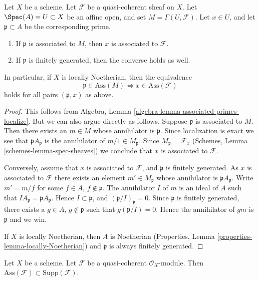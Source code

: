 \begin{lemma}
\label{lemma-associated-affine-open}
Let $X$ be a scheme. Let $\mathcal{F}$ be a quasi-coherent sheaf on $X$.
Let $\Spec(A) = U \subset X$ be an affine open, and set
$M = \Gamma(U, \mathcal{F})$.
Let $x \in U$, and let $\mathfrak p \subset A$ be the corresponding prime.
\begin{enumerate}
\item If $\mathfrak p$ is associated to $M$, then $x$ is associated
to $\mathcal{F}$.
\item If $\mathfrak p$ is finitely generated, then the converse holds
as well.
\end{enumerate}
In particular, if $X$ is locally Noetherian, then the equivalence
$$
\mathfrak p \in \text{Ass}(M) \Leftrightarrow x \in \text{Ass}(\mathcal{F})
$$
holds for all pairs $(\mathfrak p, x)$ as above.
\end{lemma}

\begin{proof}
This follows from
Algebra, Lemma \ref{algebra-lemma-associated-primes-localize}.
But we can also argue directly as follows.
Suppose $\mathfrak p$ is associated to $M$.
Then there exists an $m \in M$ whose annihilator is $\mathfrak p$.
Since localization is exact we see that
$\mathfrak pA_{\mathfrak p}$ is the annihilator of
$m/1 \in M_{\mathfrak p}$. Since $M_{\mathfrak p} = \mathcal{F}_x$
(Schemes, Lemma \ref{schemes-lemma-spec-sheaves})
we conclude that $x$ is associated to $\mathcal{F}$.

\medskip\noindent
Conversely, assume that $x$ is associated to $\mathcal{F}$,
and $\mathfrak p$ is finitely generated.
As $x$ is associated to $\mathcal{F}$
there exists an element $m' \in M_{\mathfrak p}$ whose
annihilator is $\mathfrak pA_{\mathfrak p}$. Write
$m' = m/f$ for some $f \in A$, $f \not \in \mathfrak p$.
The annihilator $I$ of $m$ is an ideal of $A$ such that
$IA_{\mathfrak p} = \mathfrak pA_{\mathfrak p}$. Hence
$I \subset \mathfrak p$, and $(\mathfrak p/I)_{\mathfrak p} = 0$.
Since $\mathfrak p$ is finitely generated,
there exists a $g \in A$, $g \not \in \mathfrak p$ such that
$g(\mathfrak p/I) = 0$. Hence the annihilator of $gm$ is
$\mathfrak p$ and we win.

\medskip\noindent
If $X$ is locally Noetherian, then $A$ is Noetherian
(Properties, Lemma \ref{properties-lemma-locally-Noetherian})
and $\mathfrak p$ is always finitely generated.
\end{proof}

\begin{lemma}
\label{lemma-ass-support}
Let $X$ be a scheme.
Let $\mathcal{F}$ be a quasi-coherent $\mathcal{O}_X$-module.
Then $\text{Ass}(\mathcal{F}) \subset \text{Supp}(\mathcal{F})$.
\end{lemma}

